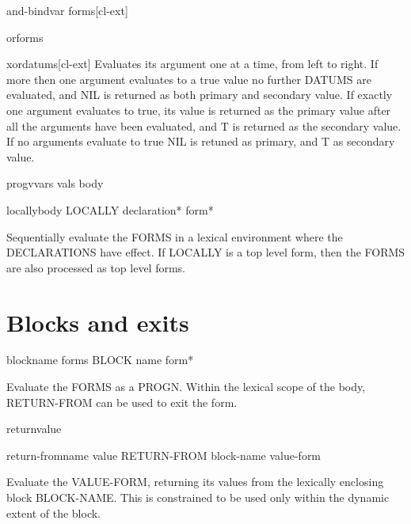 \documentclass[10pt,english]{book}
\begin{document}
\begin{macro}{and-bind}{var \rest forms}[cl-ext]
  
\end{macro}

\begin{macro}{or}{\rest forms}
  
\end{macro}

\begin{macro}{xor}{\rest datums}[cl-ext]
  Evaluates its argument one at a time, from left to right. If more then one
argument evaluates to a true value no further DATUMS are evaluated, and NIL is
returned as both primary and secondary value. If exactly one argument
evaluates to true, its value is returned as the primary value after all the
arguments have been evaluated, and T is returned as the secondary value. If no
arguments evaluate to true NIL is retuned as primary, and T as secondary
value.
\end{macro}

\begin{specialop}{progv}{vars vals \body body}
  
\end{specialop}

\begin{specialop}{locally}{\body body}
  LOCALLY declaration* form*

Sequentially evaluate the FORMS in a lexical environment where the
DECLARATIONS have effect. If LOCALLY is a top level form, then the FORMS are
also processed as top level forms.
\end{specialop}

\section{Blocks and exits}
\label{sec:blocks-exits}

\begin{specialop}{block}{name \rest forms}
  BLOCK name form*

Evaluate the FORMS as a PROGN. Within the lexical scope of the body,
RETURN-FROM can be used to exit the form.
\end{specialop}

\begin{macro}{return}{\op value}
  
\end{macro}

\begin{specialop}{return-from}{name \op value}
  RETURN-FROM block-name value-form

Evaluate the VALUE-FORM, returning its values from the lexically enclosing
block BLOCK-NAME. This is constrained to be used only within the dynamic
extent of the block.
\end{specialop}
\end{document}
